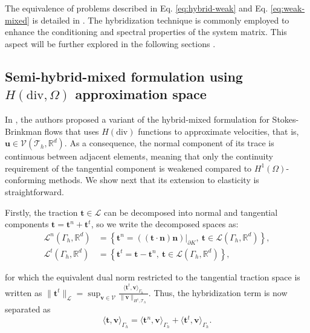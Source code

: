 \documentclass[english,11pt,3p,number,sort&compress]{elsarticle}
\begin{document}
The equivalence of problems described in Eq. \eqref{eq:hybrid-weak} and Eq. \eqref{eq:weak-mixed} is detailed in \cite{raviart1977primal}. The hybridization technique is commonly employed to enhance the conditioning and spectral properties of the system matrix. This aspect will be further explored in the following sections \cite{arnold1985mixed}.

\subsection{Semi-hybrid-mixed formulation using \(H(\mathrm{div},\Omega)\) approximation space}

In \cite{carvalho2024semi}, the authors proposed a variant of the hybrid-mixed formulation for Stokes-Brinkman flows that uses \(H(\text{div})\) functions to approximate velocities, that is, $\bm{u} \in \mathcal{V}(\mathcal{T}_h,\mathbb{R}^d)$. As a consequence, the normal component of its trace is continuous between adjacent elements, meaning that only the continuity requirement of the tangential component is weakened compared to $H^1(\Omega)$-conforming methods. We show next that its extension to elasticity is straightforward.

Firstly, the traction $\bm{t} \in \mathcal{L}$ can be decomposed into normal and tangential components $\bm{t} = \bm{t}^n + \bm{t}^t$, so we write the decomposed spaces as:
\begin{subequations}
	\begin{align}
		\mathcal{L}^n(\Gamma_h,\mathbb{R}^d) &= \left\{\bm{t}^n=((\bm{t}\cdot\bm{n})\bm{n})\lvert_{\partial K}, ~\bm{t} \in \mathcal{L}(\Gamma_h,\mathbb{R}^d) \right\} , \label{eq:space-traction-normal}\\
		\mathcal{L}^t(\Gamma_h,\mathbb{R}^d) &= \left\{\bm{t}^t=\bm{t}-\bm{t}^n, ~\bm{t} \in \mathcal{L}(\Gamma_h,\mathbb{R}^d) \right\} , \label{eq:space-traction-tangential}
	\end{align}
\end{subequations}

\noindent for which the equivalent dual norm restricted to the tangential traction space is written as $\lVert\bm{t}^t\rVert_{\mathcal{L}}=\sup_{\bm{v}\in\mathcal{V}}\frac{\langle\bm{t}^t,\bm{v} \rangle_{\Gamma_h}}{\lVert\bm{v}\rVert_{H^1,\mathcal{T}_h}}$. Thus, the hybridization term is now separated as
\begin{equation} \label{eq:traction-decomposed}
	\langle\bm{t},\bm{v}\rangle_{\Gamma_h}=\langle\bm{t}^n,\bm{v}\rangle_{\Gamma_h}+\langle\bm{t}^t,\bm{v}\rangle_{\Gamma_h} .
\end{equation}
\end{document}
